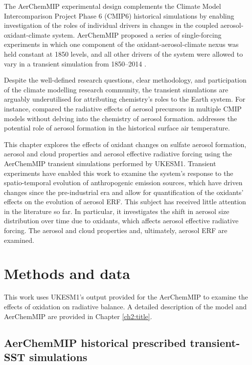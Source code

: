 The AerChemMIP experimental design complements the Climate Model Intercomparison Project Phase 6 (CMIP6) historical simulations by enabling investigation of the roles of individual drivers in changes in the coupled aerosol-oxidant-climate system. AerChemMIP proposed a series of single-forcing experiments in which one component of the oxidant-aerosol-climate nexus was held constant at 1850 levels, and all other drivers of the system were allowed to vary in a transient simulation from 1850--2014 \citep{collinsAerChemMIPQuantifyingEffects2017}. 

Despite the well-defined research questions, clear methodology, and participation of the climate modelling research community, the transient simulations are arguably underutilised for attributing chemistry's roles to the Earth system. For instance, \citet{kalisorasDecomposingEffectiveRadiative2024} compared the radiative effects of aerosol precursors in multiple CMIP models without delving into the chemistry of aerosol formation. \citet{zhangRoleAnthropogenicAerosols2021} addresses the potential role of aerosol formation in the historical surface air temperature. 

This chapter explores the effects of oxidant changes on sulfate aerosol formation, aerosol and cloud properties and aerosol effective radiative forcing using the AerChemMIP transient simulations performed by UKESM1. Transient experiments have enabled this work to examine the system's response to the spatio-temporal evolution of anthropogenic emission sources, which have driven changes since the pre-industrial era and allow for quantification of the oxidants' effects on the evolution of aerosol ERF. This subject has received little attention in the literature so far. In particular, it investigates the shift in aerosol size distribution over time due to oxidants, which affects aerosol effective radiative forcing. The aerosol and cloud properties and, ultimately, aerosol ERF are examined. 


\section{Methods and data}
\label{sec:ch3:methods}

This work uses UKESM1's output provided for the AerChemMIP to examine the effects of  oxidation on radiative balance. A detailed description of the model and AerChemMIP are provided in Chapter \ref{ch2:title}. 


\subsection{AerChemMIP historical prescribed transient-SST simulations}
\label{sec:ch3:aerchemmip}

